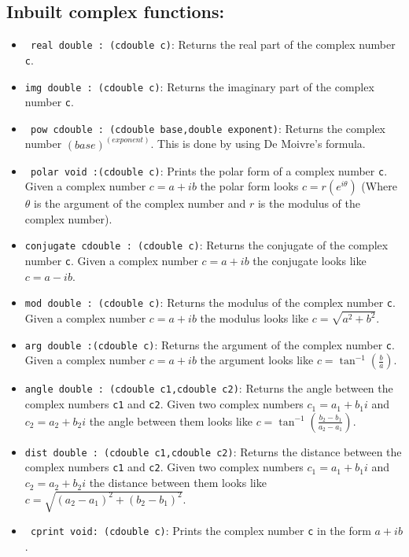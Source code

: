 \documentclass[12pt]{article}
\begin{document}
\subsection{Inbuilt complex functions:}
\begin{itemize}
    \item \texttt{ real double : (cdouble c)}: Returns the real part of the complex number \texttt{c}.
    \item \texttt{img double : (cdouble c)}: Returns the imaginary part of the complex number \texttt{c}.
    \item \texttt{ pow cdouble : (cdouble base,double exponent)}: Returns the complex number ${(base)}^{(exponent)}$. This is done by using De Moivre's formula.
    \item \texttt{ polar void :(cdouble c)}: Prints the polar form of a complex number \texttt{c}. Given a complex number $c=a+ib$ the polar form looks $c=r(e^{i \theta })$ (Where $\theta$ is the argument of the complex number and $r$ is the modulus of the complex number).
    \item \texttt{conjugate cdouble : (cdouble c)}: Returns the conjugate of the complex number \texttt{c}. Given a complex number $c=a+ib$ the conjugate looks like $c=a-ib$.
    \item \texttt{mod double : (cdouble c)}: Returns the modulus of the complex number \texttt{c}. Given a complex number $c=a+ib$ the modulus looks like $c=\sqrt{a^2+b^2}$.
    \item \texttt{arg double :(cdouble c)}: Returns the argument of the complex number \texttt{c}. Given a complex number $c=a+ib$ the argument looks like $c=\tan^{-1}(\frac{b}{a})$.
    \item \texttt{angle double : (cdouble c1,cdouble c2)}: Returns the angle between the complex numbers \texttt{c1} and \texttt{c2}. Given two complex numbers $c_1=a_1+b_1i$ and $c_2=a_2+b_2i$ the angle between them looks like $c=\tan^{-1}(\frac{b_2-b_1}{a_2-a_1})$.
    \item \texttt{dist double : (cdouble c1,cdouble c2)}: Returns the distance between the complex numbers \texttt{c1} and \texttt{c2}. Given two complex numbers $c_1=a_1+b_1i$ and $c_2=a_2+b_2i$ the distance between them looks like $c=\sqrt{(a_2-a_1)^2+(b_2-b_1)^2}$.
    \item \texttt{ cprint void: (cdouble c)}: Prints the complex number \texttt{c} in the form $a+ib$.
\end{itemize}
\end{document}
